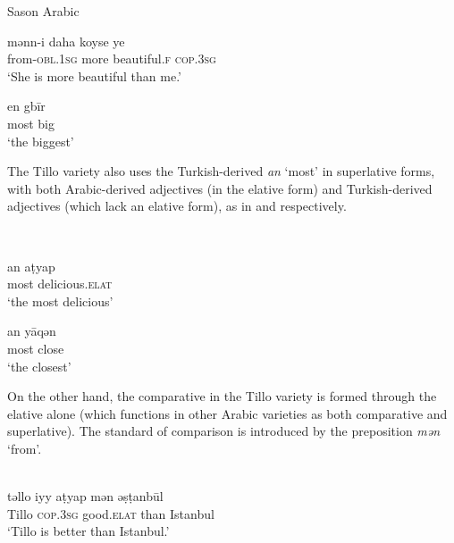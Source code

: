 \documentclass[output=paper]{langsci/langscibook}
\begin{document}
\begin{exe}
\ex \label{adj} Sason Arabic 
		\begin{xlist}
		\ex \label{adj1}\gll mənn-i daha koyse ye\\
   from-\textsc{obl.1sg} more beautiful.\textsc{f} \textsc{cop.3sg} \\
        \glt `She is more beautiful than me.'


	\ex \label{adj2} \gll en gbīr  \\
        most big\\
        \glt `the biggest'
		\end{xlist}
\end{exe}

\noindent The Tillo variety also uses the Turkish-derived \textit{an} `most' in superlative forms, with both Arabic-derived adjectives (in the elative form) and Turkish-derived adjectives (which lack an elative form), as in  and  respectively.

\begin{exe}
\ex \label{adjt}\\
		\begin{xlist}
		\ex \label{adjt1}\gll an\footnotemark	 {} aṭyap\\
    most	delicious.\textsc{elat} \\
        \glt `the most delicious'


	\ex \label{adjt2} \gll an 	yāqən  \\
        most	close\\
        \glt `the closest'
		\end{xlist}
\end{exe}

\noindent  On the other hand, the comparative in the Tillo variety is formed through the elative alone (which functions in other Arabic varieties as both comparative and superlative). The standard of comparison is introduced by the preposition \textit{mən} `from'. 

\ea\label{adjt3} \\
\gll təllo 	iyy 		aṭyap mən 	ə\d{s}ṭanbūl\\  
     Tillo	\textsc{cop.3sg}	good.\textsc{elat}	than	Istanbul \\ 
\glt `Tillo is better than Istanbul.'
\z
\end{document}

